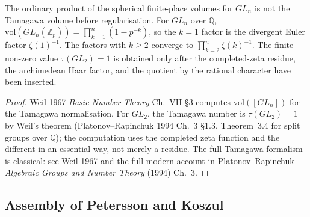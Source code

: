 \begin{lemma}
\label{v4-arith:kp:lem:adelic-convergence}
The ordinary product of the spherical
finite-place volumes for \(GL_{n}\) is not the Tamagawa volume before
regularisation. For \(GL_{n}\) over \(\mathbb{Q}\),
\(\mathrm{vol}(GL_{n}(\mathbb{Z}_{p}))=\prod_{k=1}^{n}(1-p^{-k})\),
so the \(k=1\) factor is the divergent Euler factor
\(\zeta(1)^{-1}\). The factors with \(k\geq2\) converge to
\(\prod_{k=2}^{n}\zeta(k)^{-1}\). The finite non-zero value
\(\tau(GL_{2})=1\) is obtained only after the completed-zeta residue,
the archimedean Haar factor, and the quotient by the rational
character have been inserted.
\end{lemma}

\begin{proof}
Weil 1967 \emph{Basic Number Theory} Ch.~VII \S3 computes
\(\mathrm{vol}([GL_{n}])\) for the Tamagawa normalisation. For
\(GL_{2}\), the Tamagawa number is \(\tau(GL_{2})=1\) by Weil's theorem
(Platonov--Rapinchuk 1994 Ch.~3 \S1.3, Theorem~3.4 for split groups
over \(\mathbb{Q}\)); the computation uses the completed zeta function
and the different in an essential way, not merely a residue.
The full Tamagawa formalism is
classical: see Weil 1967 and the full modern account in
Platonov--Rapinchuk \emph{Algebraic Groups and Number Theory}
(1994) Ch.~3.
\end{proof}

\subsection{Assembly of Petersson and Koszul}
\label{v4-arith:kp:adelic:assembly}

